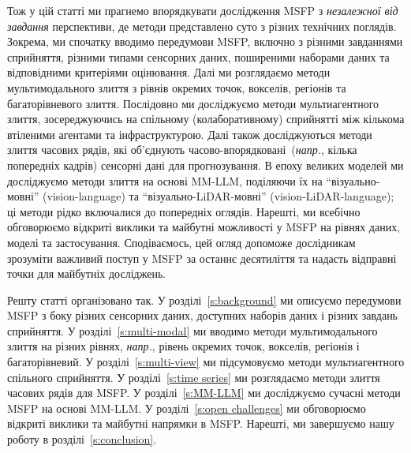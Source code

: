 Тож у цій статті ми прагнемо впорядкувати дослідження MSFP з \emph{незалежної від завдання} перспективи, де методи представлено суто з різних технічних поглядів.
Зокрема, ми спочатку вводимо передумови MSFP, включно з різними завданнями сприйняття, різними типами сенсорних даних, поширеними наборами даних та відповідними критеріями оцінювання.
Далі ми розглядаємо методи мультимодального злиття з рівнів окремих точок, вокселів, регіонів та багаторівневого злиття.
Послідовно ми досліджуємо методи мультиагентного злиття, зосереджуючись на спільному (колаборативному) сприйнятті між кількома втіленими агентами та інфраструктурою.
Далі також досліджуються методи злиття часових рядів, які об'єднують часово-впорядковані~(\textit{напр.}, кілька попередніх кадрів) сенсорні дані для прогнозування.
В епоху великих моделей ми досліджуємо методи злиття на основі MM-LLM, поділяючи їх на ``візуально-мовні'' (vision-language) та ``візуально-LiDAR-мовні'' (vision-LiDAR-language); ці методи рідко включалися до попередніх оглядів.
Нарешті, ми всебічно обговорюємо відкриті виклики та майбутні можливості у MSFP на рівнях даних, моделі та застосування.
Сподіваємось, цей огляд допоможе дослідникам зрозуміти важливий поступ у MSFP за останнє десятиліття та надасть відправні точки для майбутніх досліджень.

Решту статті організовано так.
У розділі~\ref{s:background} ми описуємо передумови MSFP з боку різних сенсорних даних, доступних наборів даних і різних завдань сприйняття.
У розділі~\ref{s:multi-modal} ми вводимо методи мультимодального злиття на різних рівнях, \textit{напр.}, рівень окремих точок, вокселів, регіонів і багаторівневий.
У розділі~\ref{s:multi-view} ми підсумовуємо методи мультиагентного спільного сприйняття.
У розділі~\ref{s:time series} ми розглядаємо методи злиття часових рядів для MSFP.
У розділі~\ref{s:MM-LLM} ми досліджуємо сучасні методи MSFP на основі MM-LLM.
У розділі~\ref{s:open challenges} ми обговорюємо відкриті виклики та майбутні напрямки в MSFP.
Нарешті, ми завершуємо нашу роботу в розділі~\ref{s:conclusion}.
